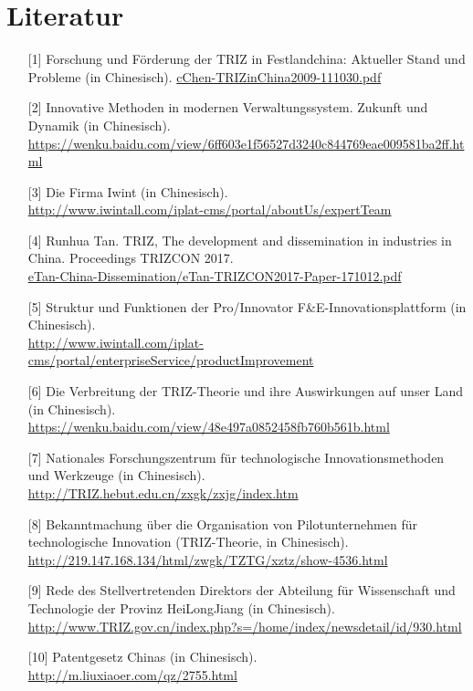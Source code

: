 \documentclass[11pt,a4paper]{article}
\begin{document}
\section{Literatur}
\begin{itemize}
\item[{[1]}] Forschung und Förderung der TRIZ in Festlandchina: Aktueller
  Stand und Probleme (in Chinesisch).  \url{cChen-TRIZinChina2009-111030.pdf}
\item[{[2]}] Innovative Methoden in modernen Verwaltungssystem. Zukunft und
  Dynamik (in Chinesisch).\\{\small
  \url{https://wenku.baidu.com/view/6ff603e1f56527d3240c844769eae009581ba2ff.html}} 
\item[{[3]}] Die Firma Iwint (in Chinesisch).\\
  \url{http://www.iwintall.com/iplat-cms/portal/aboutUs/expertTeam}
\item[{[4]}] Runhua Tan. TRIZ, The development and dissemination in industries
  in China.  Proceedings TRIZCON 2017.\\
  \url{eTan-China-Dissemination/eTan-TRIZCON2017-Paper-171012.pdf}
\item[{[5]}] Struktur und Funktionen der Pro/Innovator
  F\&E-Innovationsplattform (in Chinesisch).\\{\small
  \url{http://www.iwintall.com/iplat-cms/portal/enterpriseService/productImprovement}}
\item[{[6]}] Die Verbreitung der TRIZ-Theorie und ihre Auswirkungen auf unser
  Land (in Chinesisch).\\
  \url{https://wenku.baidu.com/view/48e497a0852458fb760b561b.html}
\item[{[7]}] Nationales Forschungszentrum für technologische
  Innovationsmethoden und Werkzeuge (in Chinesisch).
  \url{http://TRIZ.hebut.edu.cn/zxgk/zxjg/index.htm}
\item[{[8]}] Bekanntmachung über die Organisation von Pilotunternehmen für
  technologische Innovation (TRIZ-Theorie, in Chinesisch).\\
  \url{http://219.147.168.134/html/zwgk/TZTG/xztz/show-4536.html}
\item[{[9]}] Rede des Stellvertretenden Direktors der Abteilung für
  Wissenschaft und Technologie der Provinz HeiLongJiang (in Chinesisch).\\
  \url{http://www.TRIZ.gov.cn/index.php?s=/home/index/newsdetail/id/930.html}
\item[{[10]}] Patentgesetz Chinas (in Chinesisch).
  \url{http://m.liuxiaoer.com/qz/2755.html}

\end{itemize}
\end{document}
